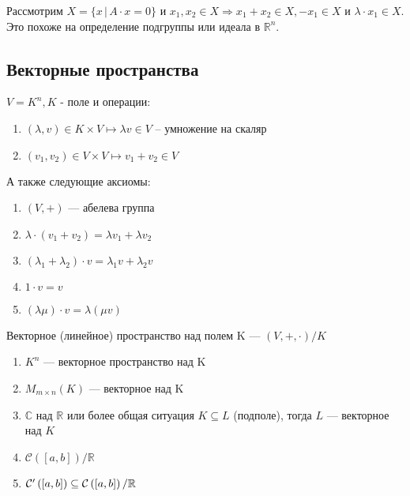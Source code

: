 \begin{remark} 
    Рассмотрим $X = \{ x \, | \, A \cdot x = 0 \}$ и $x_1, x_2 \in X \Longrightarrow x_1 + x_2 \in X, -x_1 \in X $ и $\lambda \cdot x_1 \in X$. Это похоже на определение подгруппы или идеала в $\mathbb{R}^n$.
\end{remark}

\subsection{Векторные пространства}

\begin{definition}
    
    \quad $V = K^n, K$ - поле и операции:
    \begin{enumerate}
        \item $ (\lambda, v) \in K \times V \mapsto \lambda v \in V$ -- умножение на скаляр
        \item $(v_1, v_2) \in V \times V \mapsto v_1 + v_2 \in V$
    \end{enumerate} 
    \quad А также следующие аксиомы:
    \begin{enumerate}
        \item $(V, +)$ --- абелева группа
        \item $\lambda \cdot (v_1 + v_2) = \lambda v_1 + \lambda v_2$
        \item $(\lambda_1 + \lambda_2) \cdot v = \lambda_1 v + \lambda_2 v$
        \item $1 \cdot v = v$
        \item $(\lambda \mu)\cdot v = \lambda (\mu v)$
    \end{enumerate}
\quad Векторное (линейное) пространство над полем K --- $(V, +, \cdot) / K$
\end{definition}

\quad 

\begin{examples}
    \begin{enumerate}
        \item $K^n$ --- векторное пространство над K 
        \item $M_{m \times n}(K)$ --- векторное над K
        \item $\mathbb{C}$ над $\mathbb{R}$ или более общая ситуация $K \subseteq L$ (подполе), тогда  $L$ --- векторное над $K$
        \item $\mathcal{C}([a,b]) / \mathbb{R}$
        \item $\mathcal{C}'\left([a,b]\right) \subseteq \mathcal{C}\left([a,b]\right) / \mathbb{R}$
    \end{enumerate}
    
\end{examples}

